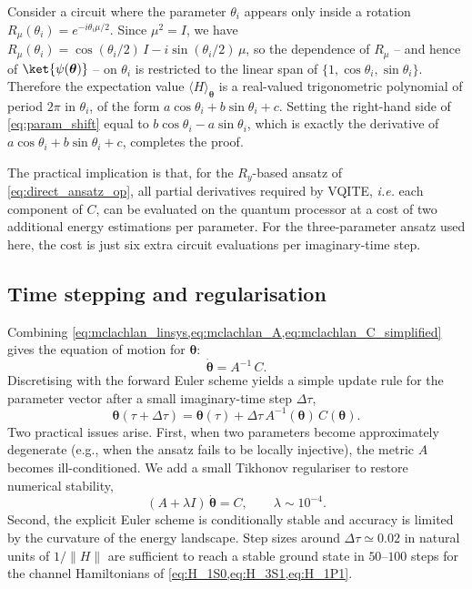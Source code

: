 \begin{remark}
Consider a circuit where the parameter $\theta_i$ appears only inside a
rotation $R_\mu(\theta_i) = e^{-i\theta_i \mu/2}$. Since $\mu^{2}=I$, we
have $R_\mu(\theta_i) = \cos(\theta_i/2)\,I - i\sin(\theta_i/2)\,\mu$, so
the dependence of $R_\mu$ -- and hence of
$\ket{\psi(\bm{\theta})}$ -- on $\theta_i$ is restricted to the linear
span of $\{1,\cos\theta_i,\sin\theta_i\}$. Therefore the expectation
value $\langle H\rangle_{\bm{\theta}}$ is a real-valued trigonometric
polynomial of period $2\pi$ in $\theta_i$, of the form
\(
  a\cos\theta_i + b\sin\theta_i + c.
\)
Setting the right-hand side of \cref{eq:param_shift} equal to
$b\cos\theta_i - a\sin\theta_i$, which is exactly the derivative of
$a\cos\theta_i + b\sin\theta_i + c$, completes the proof.
\end{remark}

The practical implication is that, for the $R_y$-based ansatz of
\cref{eq:direct_ansatz_op}, all partial derivatives required by
VQITE, \textit{i.e.} each component of $C$, can be evaluated on the quantum
processor at a cost of two additional energy estimations per parameter.
For the three-parameter ansatz used here, the cost is just six extra
circuit evaluations per imaginary-time step.

\subsection{Time stepping and regularisation}
\label{ssec:vqite_stepping}

Combining \cref{eq:mclachlan_linsys,eq:mclachlan_A,eq:mclachlan_C_simplified}
gives the equation of motion for $\bm{\theta}$:
\begin{equation}
  \label{eq:vqite_eom}
  \dot{\bm{\theta}} = A^{-1}\,C.
\end{equation}
Discretising with the forward Euler scheme yields a simple update rule
for the parameter vector after a small imaginary-time step $\Delta\tau$,
\begin{equation}
  \label{eq:vqite_update}
  \bm{\theta}(\tau + \Delta\tau)
  = \bm{\theta}(\tau)
  + \Delta\tau\,A^{-1}(\bm{\theta})\,C(\bm{\theta}).
\end{equation}
Two practical issues arise. First, when two parameters become
approximately degenerate (e.g., when the ansatz fails to be locally
injective), the metric $A$ becomes ill-conditioned. We add a small
Tikhonov regulariser to restore numerical stability,
\begin{equation}
  \label{eq:vqite_tikhonov}
  (A + \lambda I)\,\dot{\bm{\theta}} = C,
  \qquad \lambda \sim 10^{-4}.
\end{equation}
Second, the explicit Euler scheme is conditionally stable and accuracy is
limited by the curvature of the energy landscape. Step sizes around
$\Delta\tau \simeq 0.02$ in natural units of $1/\|H\|$ are sufficient to
reach a stable ground state in $50$--$100$ steps for the channel
Hamiltonians of \cref{eq:H_1S0,eq:H_3S1,eq:H_1P1}.

